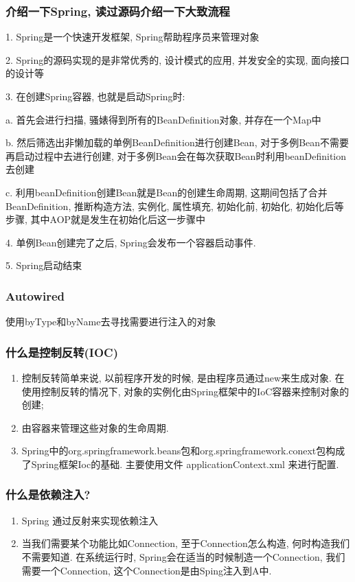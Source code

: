 \documentclass[UTF8]{ctexart}
\begin{document}
\subsubsection{介绍一下Spring, 读过源码介绍一下大致流程}
1. Spring是一个快速开发框架, Spring帮助程序员来管理对象 \par
2. Spring的源码实现的是非常优秀的, 设计模式的应用, 并发安全的实现, 面向接口的设计等 \par
3. 在创建Spring容器, 也就是启动Spring时: \par
a. 首先会进行扫描, 骚婊得到所有的BeanDefinition对象, 并存在一个Map中 \par
b. 然后筛选出非懒加载的单例BeanDefinition进行创建Bean, 对于多例Bean不需要再启动过程中去进行创建, 对于多例Bean会在每次获取Bean时利用beanDefinition去创建 \par
c. 利用beanDefinition创建Bean就是Bean的创建生命周期, 这期间包括了合并BeanDefinition, 推断构造方法, 实例化, 属性填充, 初始化前, 初始化, 初始化后等步骤, 其中AOP就是发生在初始化后这一步骤中\par
4. 单例Bean创建完了之后, Spring会发布一个容器启动事件. \par
5. Spring启动结束 \par

\subsubsection{Autowired}
使用byType和byName去寻找需要进行注入的对象
\subsubsection{什么是控制反转(IOC)}
\begin{enumerate}
	\item
	      控制反转简单来说, 以前程序开发的时候, 是由程序员通过new来生成对象. 在使用控制反转的情况下, 对象的实例化由Spring框架中的IoC容器来控制对象的创建;
	\item 由容器来管理这些对象的生命周期.
	\item Spring中的org.springframework.beans包和org.springframework.conext包构成了Spring框架Ioc的基础. 主要使用文件 applicationContext.xml 来进行配置.
\end{enumerate}

\subsubsection{什么是依赖注入?}
\begin{enumerate}
	\item Spring 通过反射来实现依赖注入
	\item 当我们需要某个功能比如Connection, 至于Connection怎么构造, 何时构造我们不需要知道. 在系统运行时, Spring会在适当的时候制造一个Connection, 我们需要一个Connection, 这个Connection是由Sping注入到A中.
\end{enumerate}
\end{document}
